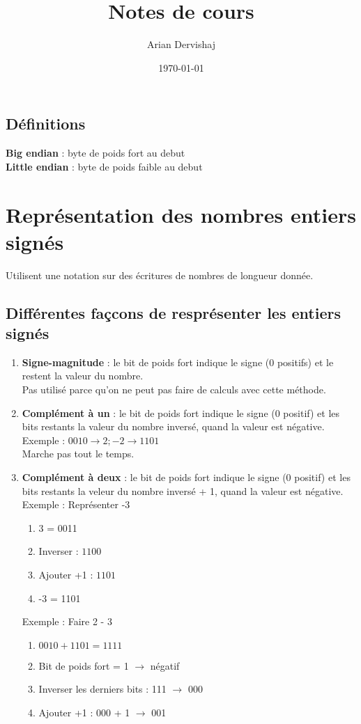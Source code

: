 \documentclass[12pt]{article}
\title{Notes de cours}
\author{Arian Dervishaj}
\date{\today}
\begin{document}
\maketitle
\pagebreak

\subsection*{Définitions}
\textbf{Big endian} : byte de poids fort au debut \\
\textbf{Little endian} : byte de poids faible au debut


\section*{Représentation des nombres entiers signés}
Utilisent une notation sur des écritures de nombres de longueur donnée.
\subsection*{Différentes façcons de resprésenter les entiers signés}
\begin{enumerate}
    \item   \textbf{Signe-magnitude} : le bit de poids fort indique le signe (0 positifs) et le restent la valeur du nombre. \\
            Pas utilisé parce qu'on ne peut pas faire de calculs avec cette méthode.
    \item   \textbf{Complément à un} : le bit de poids fort indique le signe (0 positif) et les bits restants la valeur du nombre inversé, quand la valeur est négative. \\
            Exemple : $0010 \rightarrow 2; -2 \rightarrow 1101$ \\
            Marche pas tout le temps.
    \item   \textbf{Complément à deux} : le bit de poids fort indique le signe (0 positif) et les bits restants la veleur du nombre inversé + 1, quand la valeur est négative. \\
            Exemple : Représenter -3
            \begin{enumerate}
                \item 3 = 0011
                \item Inverser : $1100$
                \item Ajouter +1 : $1101$
                \item -3 = 1101 
            \end{enumerate} 
            Exemple : Faire 2 - 3
            \begin{enumerate}
                \item $0010 + 1101 = 1111$
                \item Bit de poids fort = 1 $\rightarrow$ négatif
                \item Inverser les derniers bits : 111 $\rightarrow$ 000
                \item Ajouter +1 : 000 + 1 $\rightarrow$ 001
            \end{enumerate} 
\end{enumerate}
\end{document}
